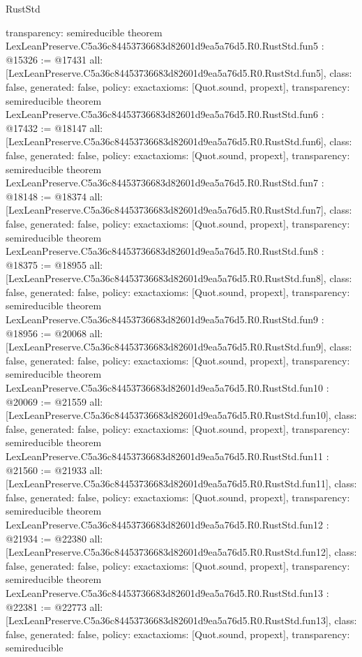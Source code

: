 \begin{lexlean}{RustStd}
\begin{coremodule}
{  transparency: semireducible
}
theorem LexLeanPreserve.C5a36c84453736683d82601d9ea5a76d5.R0.RustStd.fun5 : @15326 := @17431 {
  all: [LexLeanPreserve.C5a36c84453736683d82601d9ea5a76d5.R0.RustStd.fun5],
  class: false,
  generated: false,
  policy: exact{axioms: [Quot.sound, propext]},
  transparency: semireducible
}
theorem LexLeanPreserve.C5a36c84453736683d82601d9ea5a76d5.R0.RustStd.fun6 : @17432 := @18147 {
  all: [LexLeanPreserve.C5a36c84453736683d82601d9ea5a76d5.R0.RustStd.fun6],
  class: false,
  generated: false,
  policy: exact{axioms: [Quot.sound, propext]},
  transparency: semireducible
}
theorem LexLeanPreserve.C5a36c84453736683d82601d9ea5a76d5.R0.RustStd.fun7 : @18148 := @18374 {
  all: [LexLeanPreserve.C5a36c84453736683d82601d9ea5a76d5.R0.RustStd.fun7],
  class: false,
  generated: false,
  policy: exact{axioms: [Quot.sound, propext]},
  transparency: semireducible
}
theorem LexLeanPreserve.C5a36c84453736683d82601d9ea5a76d5.R0.RustStd.fun8 : @18375 := @18955 {
  all: [LexLeanPreserve.C5a36c84453736683d82601d9ea5a76d5.R0.RustStd.fun8],
  class: false,
  generated: false,
  policy: exact{axioms: [Quot.sound, propext]},
  transparency: semireducible
}
theorem LexLeanPreserve.C5a36c84453736683d82601d9ea5a76d5.R0.RustStd.fun9 : @18956 := @20068 {
  all: [LexLeanPreserve.C5a36c84453736683d82601d9ea5a76d5.R0.RustStd.fun9],
  class: false,
  generated: false,
  policy: exact{axioms: [Quot.sound, propext]},
  transparency: semireducible
}
theorem LexLeanPreserve.C5a36c84453736683d82601d9ea5a76d5.R0.RustStd.fun10 : @20069 := @21559 {
  all: [LexLeanPreserve.C5a36c84453736683d82601d9ea5a76d5.R0.RustStd.fun10],
  class: false,
  generated: false,
  policy: exact{axioms: [Quot.sound, propext]},
  transparency: semireducible
}
theorem LexLeanPreserve.C5a36c84453736683d82601d9ea5a76d5.R0.RustStd.fun11 : @21560 := @21933 {
  all: [LexLeanPreserve.C5a36c84453736683d82601d9ea5a76d5.R0.RustStd.fun11],
  class: false,
  generated: false,
  policy: exact{axioms: [Quot.sound, propext]},
  transparency: semireducible
}
theorem LexLeanPreserve.C5a36c84453736683d82601d9ea5a76d5.R0.RustStd.fun12 : @21934 := @22380 {
  all: [LexLeanPreserve.C5a36c84453736683d82601d9ea5a76d5.R0.RustStd.fun12],
  class: false,
  generated: false,
  policy: exact{axioms: [Quot.sound, propext]},
  transparency: semireducible
}
theorem LexLeanPreserve.C5a36c84453736683d82601d9ea5a76d5.R0.RustStd.fun13 : @22381 := @22773 {
  all: [LexLeanPreserve.C5a36c84453736683d82601d9ea5a76d5.R0.RustStd.fun13],
  class: false,
  generated: false,
  policy: exact{axioms: [Quot.sound, propext]},
  transparency: semireducible
}
\end{coremodule}
\end{lexlean}
